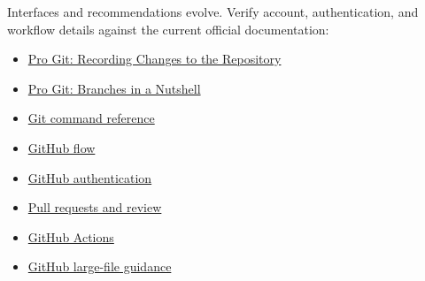 Interfaces and recommendations evolve. Verify account, authentication, and
workflow details against the current official documentation:

\begin{itemize}
  \item \href{https://git-scm.com/book/en/v2/Git-Basics-Recording-Changes-to-the-Repository}{Pro Git: Recording Changes to the Repository}
  \item \href{https://git-scm.com/book/en/v2/Git-Branching-Branches-in-a-Nutshell}{Pro Git: Branches in a Nutshell}
  \item \href{https://git-scm.com/docs}{Git command reference}
  \item \href{https://docs.github.com/en/get-started/using-github/github-flow}{GitHub flow}
  \item \href{https://docs.github.com/en/authentication}{GitHub authentication}
  \item \href{https://docs.github.com/en/pull-requests}{Pull requests and review}
  \item \href{https://docs.github.com/en/actions}{GitHub Actions}
  \item \href{https://docs.github.com/en/repositories/working-with-files/managing-large-files}{GitHub large-file guidance}
\end{itemize}

